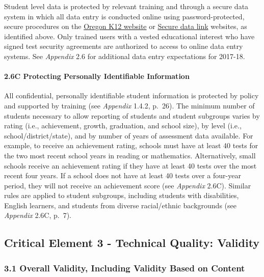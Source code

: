 \documentclass[]{article}
\let\oldparagraph\paragraph
\renewcommand{\paragraph}[1]{\oldparagraph{#1}\mbox{}}
\begin{document}
Student level data is protected by relevant training and through a
secure data system in which all data entry is conducted online using
password-protected, secure procedures on the \color{link}
\href{https://or.k12test.com}{Oregon K12 website} \color{black} or
\color{link} \href{https://district.ode.state.or.us/apps/login/}{Secure
data link} \color{black} websites, as identified above. Only trained
users with a vested educational interest who have signed test security
agreements are authorized to access to online data entry systems. See
\emph{Appendix} 2.6 for additional data entry expectations for 2017-18.

\paragraph{2.6C Protecting Personally Identifiable
Information}\label{c-protecting-personally-identifiable-information}

All confidential, personally identifiable student information is
protected by policy and supported by training (see \emph{Appendix}
1.4.2, p.~26). The minimum number of students necessary to allow
reporting of students and student subgroups varies by rating (i.e.,
achievement, growth, graduation, and school size), by level (i.e.,
school/district/state), and by number of years of assessment data
available. For example, to receive an achievement rating, schools must
have at least 40 tests for the two most recent school years in reading
or mathematics. Alternatively, small schools receive an achievement
rating if they have at least 40 tests over the most recent four years.
If a school does not have at least 40 tests over a four-year period,
they will not receive an achievement score (see \emph{Appendix} 2.6C).
Similar rules are applied to student subgroups, including students with
disabilities, English learners, and students from diverse racial/ethnic
backgrounds (see \emph{Appendix} 2.6C, p.~7).

\subsection{Critical Element 3 - Technical Quality:
Validity}\label{critical-element-3---technical-quality-validity}

\subsubsection{3.1 Overall Validity, Including Validity Based on
Content}\label{overall-validity-including-validity-based-on-content}
\end{document}
